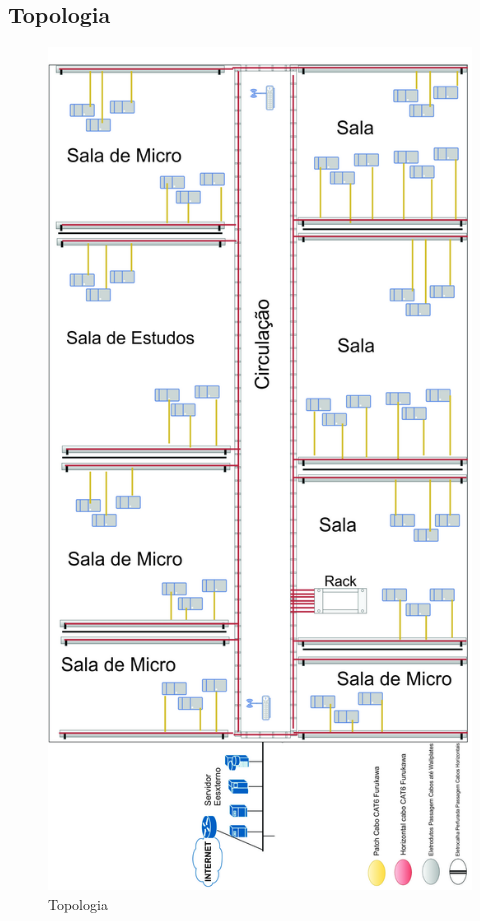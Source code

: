 \documentclass[	DIV=calc,%
							paper=a4,%
							fontsize=12pt,%
							onecolumn]{scrartcl}	 					%
\begin{document}
\subsection{Topologia}
\begin{figure}[!h]
	\centering
	\caption{Topologia}
	\includegraphics{topologia}
\end{figure}
\end{document}

